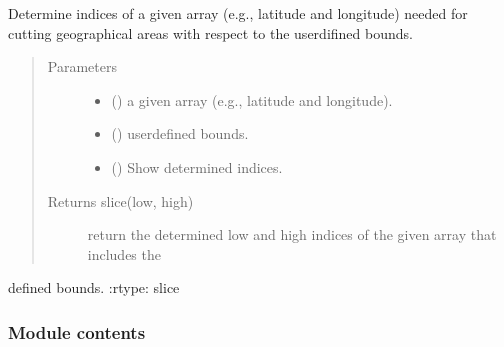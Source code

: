 \documentclass[a4paper,11pt,english]{sphinxmanual}
\begin{document}
\begin{fulllineitems}
\label{\detokenize{envlib:envlib.weather_store.get_bound_indexes}}
Determine indices of a given array (e.g., latitude and longitude) needed for cutting geographical areas with respect to the user\sphinxhyphen{}difined bounds.
\begin{quote}\begin{description}
\item[{Parameters}] \leavevmode\begin{itemize}
\item {} 
 () \textendash{} a given array (e.g., latitude and longitude).

\item {} 
 () \textendash{} user\sphinxhyphen{}defined bounds.

\item {} 
 () \textendash{} Show determined indices.

\end{itemize}

\item[{Returns slice(low, high)}] \leavevmode
return the determined low and high indices of the given array that includes the

\end{description}\end{quote}

defined bounds.
:rtype: slice

\end{fulllineitems}



\subsubsection{Module contents}
\label{\detokenize{envlib:module-envlib}}\label{\detokenize{envlib:module-contents}}
\end{document}
